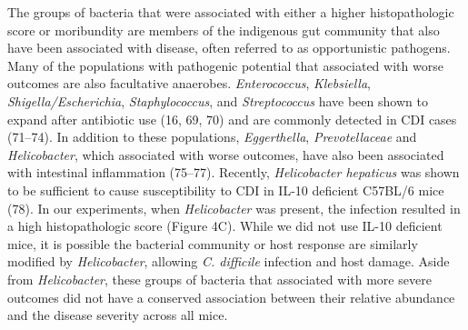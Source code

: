 \documentclass[
  12pt,
]{article}
\begin{document}
The groups of bacteria that were associated with either a higher
histopathologic score or moribundity are members of the indigenous gut
community that also have been associated with disease, often referred to
as opportunistic pathogens. Many of the populations with pathogenic
potential that associated with worse outcomes are also facultative
anaerobes. \emph{Enterococcus}, \emph{Klebsiella},
\emph{Shigella/Escherichia}, \emph{Staphylococcus}, and
\emph{Streptococcus} have been shown to expand after antibiotic use (16,
69, 70) and are commonly detected in CDI cases (71--74). In addition to
these populations, \emph{Eggerthella}, \emph{Prevotellaceae} and
\emph{Helicobacter}, which associated with worse outcomes, have also
been associated with intestinal inflammation (75--77). Recently,
\emph{Helicobacter hepaticus} was shown to be sufficient to cause
susceptibility to CDI in IL-10 deficient C57BL/6 mice (78). In our
experiments, when \emph{Helicobacter} was present, the infection
resulted in a high histopathologic score (Figure 4C). While we did not
use IL-10 deficient mice, it is possible the bacterial community or host
response are similarly modified by \emph{Helicobacter}, allowing
\emph{C. difficile} infection and host damage. Aside from
\emph{Helicobacter}, these groups of bacteria that associated with more
severe outcomes did not have a conserved association between their
relative abundance and the disease severity across all mice.
\end{document}
